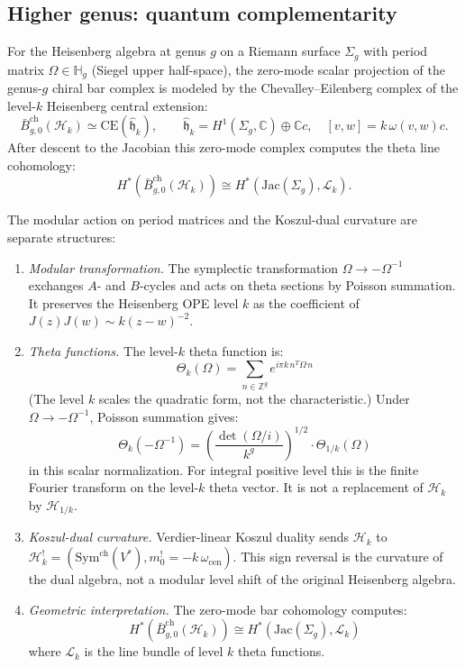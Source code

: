 \subsection{Higher genus: quantum complementarity}

\begin{theorem}\label{thm:heisenberg-genus-g}
For the Heisenberg algebra at genus $g$ on a Riemann surface
$\Sigma_g$ with period matrix $\Omega \in \mathbb{H}_g$ (Siegel upper
half-space), the zero-mode scalar projection of the genus-$g$ chiral
bar complex is modeled by the Chevalley--Eilenberg complex of the
level-$k$ Heisenberg central extension:
\[
\bar{B}^{\text{ch}}_{g,0}(\mathcal{H}_k)
\simeq \mathrm{CE}(\hat{\mathfrak{h}}_k),
\qquad
\hat{\mathfrak h}_k=H^1(\Sigma_g,\mathbb C)\oplus\mathbb C c,
\quad [v,w]=k\,\omega(v,w)c.
\]
After descent to the Jacobian this zero-mode complex computes the
theta line cohomology:
\[
H^*(\bar{B}^{\text{ch}}_{g,0}(\mathcal{H}_k))
\cong H^*(\mathrm{Jac}(\Sigma_g), \mathcal{L}_k).
\]

The modular action on period matrices and the Koszul-dual curvature
are separate structures:
\begin{enumerate}
\item \emph{Modular transformation.} The symplectic transformation
$\Omega \to -\Omega^{-1}$ exchanges $A$- and $B$-cycles and acts on
theta sections by Poisson summation. It preserves the Heisenberg OPE
level $k$ as the coefficient of $J(z)J(w)\sim k(z-w)^{-2}$.

\item \emph{Theta functions.} The level-$k$ theta function is:
\[\Theta_k(\Omega) = \sum_{n \in \mathbb{Z}^g} e^{i\pi k \, n^T \Omega \, n}\]
(The level $k$ scales the quadratic form, not the characteristic.)
Under $\Omega \to -\Omega^{-1}$, Poisson summation gives:
\[\Theta_k(-\Omega^{-1}) = \left(\frac{\det(\Omega/i)}{k^g}\right)^{1/2} \cdot \Theta_{1/k}(\Omega)\]
in this scalar normalization. For integral positive level this is the
finite Fourier transform on the level-$k$ theta vector. It is not a
replacement of $\mathcal H_k$ by $\mathcal H_{1/k}$.

\item \emph{Koszul-dual curvature.} Verdier-linear Koszul duality
sends $\mathcal H_k$ to
$\mathcal H_k^!=(\mathrm{Sym}^{\mathrm{ch}}(V^*),
m_0^!=-k\,\omega_{\mathrm{cen}})$. This sign reversal is the
curvature of the dual algebra, not a modular level shift of the
original Heisenberg algebra.

\item \emph{Geometric interpretation.} The zero-mode bar cohomology computes:
\[H^*(\bar{B}_{g,0}^{\text{ch}}(\mathcal{H}_k)) \cong H^*(\text{Jac}(\Sigma_g), \mathcal{L}_k)\]
where $\mathcal{L}_k$ is the line bundle of level $k$ theta functions.
\end{enumerate}
\end{theorem}

